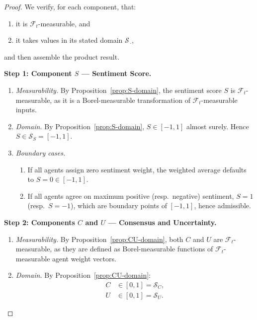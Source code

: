 \documentclass[12pt,openany]{book}
\newcommand{\calF}{\mathcal{F}}
\numberwithin{equation}{chapter}
\theoremstyle{plain}
\theoremstyle{definition}
\theoremstyle{remark}
\numberwithin{equation}{chapter}
\theoremstyle{plain}
\begin{document}
\begin{proof}
We verify, for each component, that:
\begin{enumerate}[label=(\roman*)]
  \item it is $\calF_t$-measurable, and
  \item it takes values in its stated domain $\mathcal{S}_{\,\cdot}$,
\end{enumerate}
and then assemble the product result.

\medskip
\noindent\textbf{Step 1: Component $S$ — Sentiment Score.}
\begin{enumerate}
  \item \emph{Measurability.}
    By Proposition~\ref{prop:S-domain}, the sentiment score $S$
    is $\calF_t$-measurable, as it is a Borel-measurable
    transformation of $\calF_t$-measurable inputs.

  \item \emph{Domain.}
    By Proposition~\ref{prop:S-domain}, $S \in [-1, 1]$
    almost surely.
    Hence $S \in \mathcal{S}_S = [-1,1]$.

  \item \emph{Boundary cases.}
    \begin{enumerate}
      \item If all agents assign zero sentiment weight, the
        weighted average defaults to $S = 0 \in [-1,1]$.
      \item If all agents agree on maximum positive (resp.\
        negative) sentiment, $S = 1$ (resp.\ $S = -1$), which
        are boundary points of $[-1,1]$, hence admissible.
    \end{enumerate}
\end{enumerate}

\medskip
\noindent\textbf{Step 2: Components $C$ and $U$ — Consensus and
Uncertainty.}
\begin{enumerate}
  \item \emph{Measurability.}
    By Proposition~\ref{prop:CU-domain}, both $C$ and $U$ are
    $\calF_t$-measurable, as they are defined as
    Borel-measurable functions of $\calF_t$-measurable agent
    weight vectors.

  \item \emph{Domain.}
    By Proposition~\ref{prop:CU-domain}:
    \begin{align}
      C &\in [0,1]
        = \mathcal{S}_C, \\[2pt]
      U &\in [0,1]
        = \mathcal{S}_U.
    \end{align}


\end{enumerate}
\end{proof}
\end{document}
